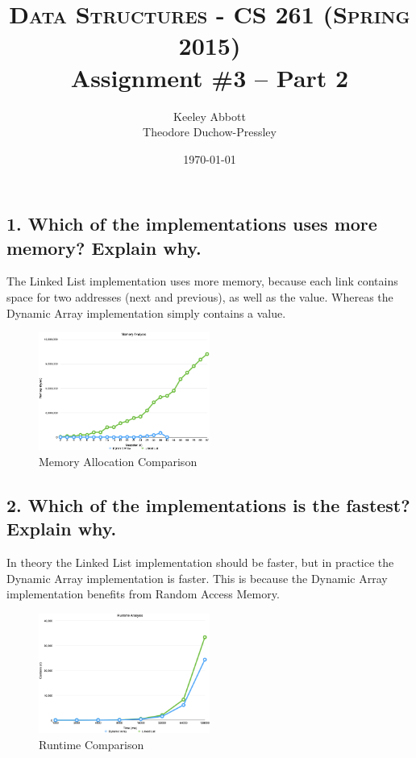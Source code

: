 \documentclass[letter,11pt]{scrartcl}
\title{
  \normalfont \normalsize
  \textsc{Data Structures - CS 261 (Spring 2015)} \\
  \huge Assignment \#3 -- Part 2
}
\author{Keeley Abbott
\\ Theodore Duchow-Pressley}
\date{\normalsize\today}
\begin{document}
\maketitle


\subsection*{1. Which of the implementations uses more memory? Explain why.}

The Linked List implementation uses more memory, because each link contains
space for two addresses (next and previous), as well as the value. Whereas the
Dynamic Array implementation simply contains a value.

\begin{figure}[H]
  \centering
  \includegraphics[width=0.5\textwidth]{memory}
  \caption{Memory Allocation Comparison}
\end{figure}


\subsection*{2. Which of the implementations is the fastest? Explain why.}

In theory the Linked List implementation should be faster, but in practice the
Dynamic Array implementation is faster. This is because the Dynamic Array
implementation benefits from Random Access Memory.

\begin{figure}[H]
  \centering
  \includegraphics[width=0.5\textwidth]{runtime}
  \caption{Runtime Comparison}
\end{figure}
\end{document}
